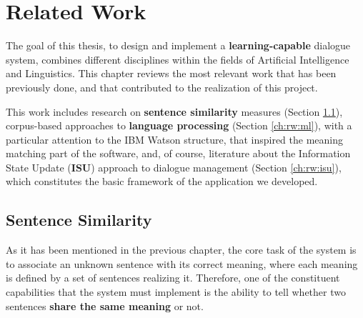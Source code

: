 
\chapter{Related Work} %

\label{ch:rw} %


The goal of this thesis, to design and implement a \textbf{learning-capable} dialogue system, combines different disciplines within the fields of Artificial Intelligence and Linguistics. This chapter reviews the most relevant work that has been previously done, and that contributed to the realization of this project.

This work includes research on \textbf{sentence similarity} measures (Section \ref{ch:rw:sim}), corpus-based approaches to \textbf{language processing} (Section \ref{ch:rw:ml}), with a particular attention to the IBM Watson structure, that inspired the meaning matching part of the software, and, of course, literature about the Information State Update (\textbf{ISU}) approach to dialogue management (Section \ref{ch:rw:isu}), which constitutes the basic framework of the application we developed.


\section{Sentence Similarity} \label{ch:rw:sim}
As it has been mentioned in the previous chapter, the core task of the system is to associate an unknown sentence with its correct meaning, where each meaning is defined by a set of sentences realizing it. Therefore, one of the constituent capabilities that the system must implement is the ability to tell whether two sentences \textbf{share the same meaning} or not.

